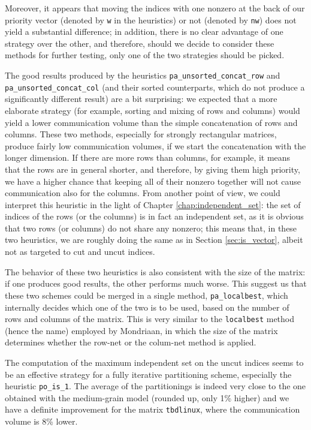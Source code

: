 Moreover, it appears that moving the indices with one nonzero at the back of our priority vector (denoted by \verb|w| in the heuristics) or not (denoted by \verb|nw|) does not yield a substantial difference; in addition, there is no clear advantage of one strategy over the other, and therefore, should we decide to consider these methods for further testing, only one of the two strategies should be picked.

The good results produced by the heuristics \verb|pa_unsorted_concat_row| and \verb|pa_unsorted_concat_col| (and their sorted counterparts, which do not produce a significantly different result) are a bit surprising: we expected that a more elaborate strategy (for example, sorting and mixing of rows and columns) would yield a lower communication volume than the simple concatenation of rows and columns. These two methods, especially for strongly rectangular matrices, produce fairly low communication volumes, if we start the concatenation with the longer dimension. If there are more rows than columns, for example, it means that the rows are in general shorter, and therefore, by giving them high priority, we have a higher chance that keeping all of their nonzero together will not cause communication also for the columns. From another point of view, we could interpret this heuristic in the light of Chapter \ref{chap:independent_set}: the set of indices of the rows (or the columns) is in fact an independent set, as it is obvious that two rows (or columns) do not share any nonzero; this means that, in these two heuristics, we are roughly doing the same as in Section \ref{sec:is_vector}, albeit not as targeted to cut and uncut indices. 

The behavior of these two heuristics is also consistent with the size of the matrix: if one produces good results, the other performs much worse. This suggest us that these two schemes could be merged in a single method, \verb|pa_localbest|, which internally decides which one of the two is to be used, based on the number of rows and columns of the matrix. This is very similar to the \verb|localbest| method (hence the name) employed by Mondriaan, in which the size of the matrix determines whether the row-net or the colum-net method is applied.

The computation of the maximum independent set on the uncut indices seems to be an effective strategy for a fully iterative partitioning scheme, especially the heuristic \verb|po_is_1|. The average of the partitionings is indeed very close to the one obtained with the medium-grain model (rounded up, only 1\% higher) and we have a definite improvement for the matrix \verb|tbdlinux|, where the communication volume is 8\% lower.

